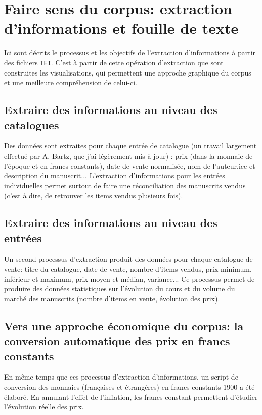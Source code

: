 \documentclass[a4paper, 12pt, twoside]{book}
\newcommand{\tei}{\texttt{TEI}}
\begin{document}
\section{Faire sens du corpus: extraction d'informations et fouille de texte}
Ici sont décrits le processus et les objectifs de l'extraction d'informations à partir des fichiers \tei{}. C'est à partir de cette opération d'extraction que sont construites les visualisations, qui permettent une approche graphique du corpus et une meilleure compréhension de celui-ci.

\subsection{Extraire des informations au niveau des catalogues}
Des données sont extraites pour chaque entrée de catalogue (un travail largement effectué par A. Bartz, que j'ai légèrement mis à jour) : prix (dans la monnaie de l'époque et en francs constants), date de vente normalisée, nom de l'auteur.ice et description du manuscrit... L'extraction d'informations pour les entrées individuelles permet surtout de faire une réconciliation des manuscrits vendus (c'est à dire, de retrouver les items vendus plusieurs fois).

\subsection{Extraire des informations au niveau des entrées}
Un second processus d'extraction produit des données pour chaque catalogue de vente: titre du catalogue, date de vente, nombre d'items vendus, prix minimum, inférieur et maximum, prix moyen et médian, variance... Ce processus permet de produire des données statistiques sur l'évolution du cours et du volume du marché des manuscrits (nombre d'items en vente, évolution des prix).

\subsection{Vers une approche économique du corpus: la conversion automatique des prix en francs constants}
En même temps que ces processus d'extraction d'informations, un script de conversion des monnaies (françaises et étrangères) en francs constants 1900 a été élaboré. En annulant l'effet de l'inflation, les francs constant permettent d'étudier l'évolution réelle des prix.
\end{document}

